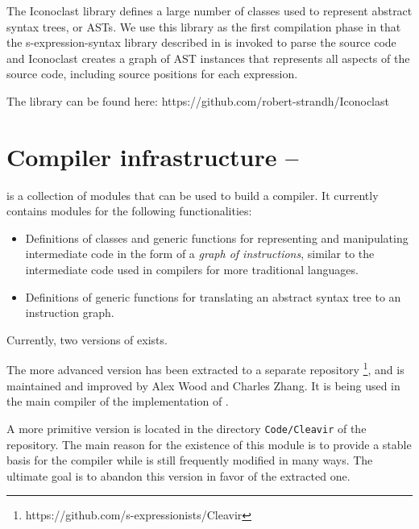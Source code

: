 The Iconoclast library defines a large number of classes used to
represent abstract syntax trees, or ASTs.  We use this library as the
first compilation phase in that the s-expression-syntax library
described in  is invoked to parse
the source code and Iconoclast creates a graph of AST instances that
represents all aspects of the source code, including source positions
for each expression.

The library can be found here: https://github.com/robert-strandh/Iconoclast

\section{Compiler infrastructure -- \cleavir{}}
\label{sec-cleavir}

\cleavir{} is a collection of modules that can be used to build a
\commonlisp{} compiler.  It currently contains modules for the
following functionalities:

\begin{itemize}
\item Definitions of classes and generic functions for representing
  and manipulating intermediate code in the form of a \emph{graph of
    instructions}, similar to the intermediate code used in compilers
  for more traditional languages.
\item Definitions of generic functions for translating an abstract
  syntax tree to an instruction graph.
\end{itemize}

Currently, two versions of \cleavir{} exists.

The more advanced version has been extracted to a separate repository%
\footnote{https://github.com/s-expressionists/Cleavir}, and is
maintained and improved by Alex Wood and Charles Zhang.  It is being
used in the main compiler of the \clasp{} implementation of
\commonlisp{}.

A more primitive version is located in the directory
\texttt{Code/Cleavir} of the \sysname{} repository.  The main reason
for the existence of this module is to provide a stable basis for the
\sysname{} compiler while \sysname{} is still frequently modified in
many ways.  The ultimate goal is to abandon this version in favor of
the extracted one.
